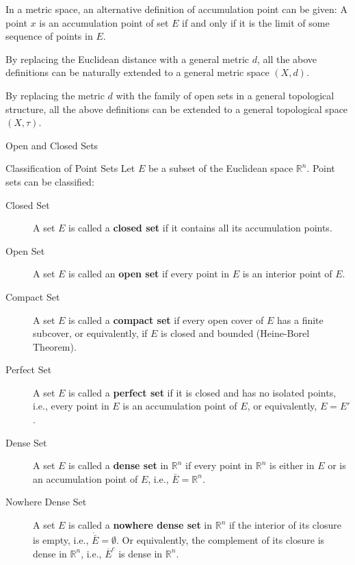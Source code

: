\begin{note}
    In a metric space, an alternative definition of accumulation point can be given:
    A point \(x\) is an accumulation point of set \(E\) if and only if it is the limit of some sequence of points in \(E\).
\end{note}

\begin{remark}
    By replacing the Euclidean distance with a general metric \(d\), 
    all the above definitions can be naturally extended to a general metric space \((X, d)\).

    By replacing the metric \(d\) with the family of open sets in a general topological structure,
    all the above definitions can be extended to a general topological space \((X, \tau)\).
\end{remark}

\begin{leftbarTitle}{Open and Closed Sets}\end{leftbarTitle} %
\begin{definition}{Classification of Point Sets} %
    Let \(E\) be a subset of the Euclidean space \(\mathbb{R}^n\).
    Point sets can be classified:
    \begin{description}
        \item[Closed Set] A set \(E\) is called a \textbf{closed set} if it contains all its accumulation points.
        \item[Open Set] A set \(E\) is called an \textbf{open set} if every point in \(E\) is an interior point of \(E\).
        \item[Compact Set] A set \(E\) is called a \textbf{compact set} if every open cover of \(E\) has a finite subcover,
            or equivalently, if \(E\) is closed and bounded (Heine-Borel Theorem).
        \item[Perfect Set] A set \(E\) is called a \textbf{perfect set} if it is closed and has no isolated points, 
            i.e., every point in \(E\) is an accumulation point of \(E\), or equivalently, \(E=E'\).
        \item[Dense Set] A set \(E\) is called a \textbf{dense set} in \(\mathbb{R}^n\) if every point in \(\mathbb{R}^n\) 
            is either in \(E\) or is an accumulation point of \(E\), i.e., \(\bar{E} = \mathbb{R}^n\).
        \item[Nowhere Dense Set] A set \(E\) is called a \textbf{nowhere dense set} in \(\mathbb{R}^n\) 
            if the interior of its closure is empty, i.e., \(\mathring{\bar{E}} = \emptyset\).
            Or equivalently, the complement of its closure is dense in \(\mathbb{R}^n\), i.e., 
            \(\overline{E}^c\) is dense in \(\mathbb{R}^n\).
    \end{description}
\end{definition}

